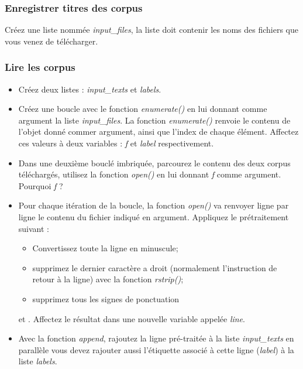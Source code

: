 \subsubsection{Enregistrer titres des corpus}

Créez une liste nommée \textit{input\_files}, la liste doit contenir les noms des fichiers que vous venez de télécharger.%


\subsubsection{Lire les corpus}

\begin{itemize}
	\item Créez deux listes : \textit{input\_texts} et \textit{labels}.
	\item Créez une boucle avec le fonction \textit{enumerate()} en lui donnant comme argument la liste \textit{input\_files}. La fonction \textit{enumerate()} renvoie le contenu de l'objet donné commer argument, ainsi que l'index de chaque élément. Affectez ces valeurs à deux variables : \textit{f} et \textit{label} respectivement.
	\item Dans une deuxième bouclé imbriquée, parcourez le contenu des deux corpus téléchargés, utilisez la fonction \textit{open()} en lui donnant \textit{f} comme argument. Pourquoi \textit{f} ?
	\item Pour chaque itération de la boucle, la fonction \textit{open()} va renvoyer ligne par ligne le contenu du fichier indiqué en argument. Appliquez le prétraitement suivant :
	\begin{itemize}
		\item Convertissez toute la ligne en minuscule;
		\item supprimez le dernier caractère a droit (normalement l'instruction de retour à la ligne) avec la fonction \textit{rstrip()};
		\item supprimez tous les signes de ponctuation
	\end{itemize}
	 et . Affectez le résultat dans une nouvelle variable appelée \textit{line}.
	\item Avec la fonction \textit{append}, rajoutez la ligne pré-traitée à la liste \textit{input\_texts} en parallèle vous devez rajouter aussi l'étiquette associé à cette ligne (\textit{label}) à la liste \textit{labels}.
\end{itemize}

